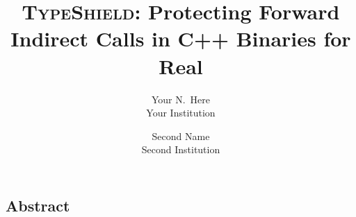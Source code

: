 \documentclass[letterpaper,twocolumn,10pt]{article}
\begin{document}
\date{}

\title{\Large \bf \textsc{TypeShield}: Protecting Forward Indirect Calls in C++ Binaries for Real}

\author{
{\rm Your N.\ Here}\\
Your Institution
\and
{\rm Second Name}\\
Second Institution
} %

\maketitle

\thispagestyle{plain}
\pagestyle{plain}

\thispagestyle{empty}


\subsection*{Abstract}

	











\listoftodos



{\footnotesize 
}


% 
\end{document}

